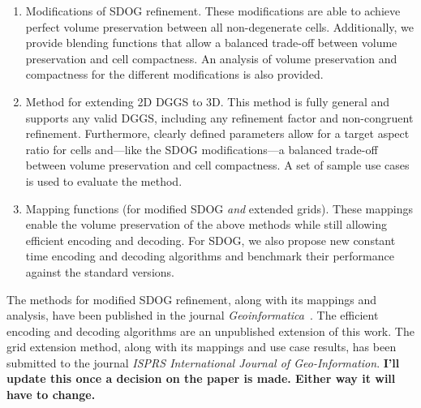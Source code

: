 \begin{enumerate}
	\item Modifications of SDOG refinement.
	These modifications are able to achieve perfect volume preservation between all non-degenerate cells.
	Additionally, we provide blending functions that allow a balanced trade-off between volume preservation and cell compactness.
	An analysis of volume preservation and compactness for the different modifications is also provided.
	
	\item Method for extending 2D DGGS to 3D.
	This method is fully general and supports any valid DGGS, including any refinement factor and non-congruent refinement.
	Furthermore, clearly defined parameters allow for a target aspect ratio for cells and---like the SDOG modifications---a balanced trade-off between volume preservation and cell compactness.
	A set of sample use cases is used to evaluate the method.
	
	\item Mapping functions (for modified SDOG \textit{and} extended grids).
	These mappings enable the volume preservation of the above methods while still allowing efficient encoding and decoding.
	For SDOG, we also propose new constant time encoding and decoding algorithms and benchmark their performance against the standard versions.
\end{enumerate}

The methods for modified SDOG refinement, along with its mappings and analysis, have been published in the journal \textit{Geoinformatica}~\cite{ulmertoward2020}.
The efficient encoding and decoding algorithms are an unpublished extension of this work.
The grid extension method, along with its mappings and use case results, has been submitted to the journal \textit{ISPRS International Journal of Geo-Information}. \textbf{I'll update this once a decision on the paper is made. Either way it will have to change.}


